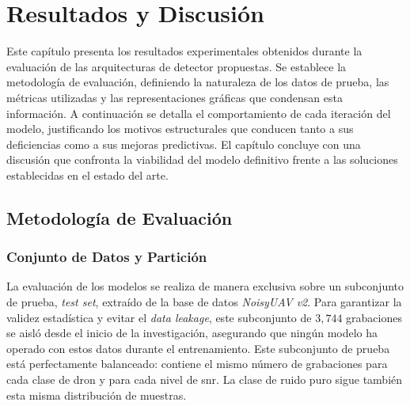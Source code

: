 \chapter{Resultados y Discusión}
\label{cap:resultados_discusion}

Este capítulo presenta los resultados experimentales obtenidos durante la evaluación de las arquitecturas de detector propuestas. Se establece la metodología de evaluación, definiendo la naturaleza de los datos de prueba, las métricas utilizadas y las representaciones gráficas que condensan esta información. A continuación se detalla el comportamiento de cada iteración del modelo, justificando los motivos estructurales que conducen tanto a sus deficiencias como a sus mejoras predictivas. El capítulo concluye con una discusión que confronta la viabilidad del modelo definitivo frente a las soluciones establecidas en el estado del arte.

\section{Metodología de Evaluación}
\label{sec:metodologia_evaluacion}

\subsection{Conjunto de Datos y Partición}
\label{subsec:eval_dataset}

La evaluación de los modelos se realiza de manera exclusiva sobre un subconjunto de prueba, \textit{test set}, extraído de la base de datos \textit{NoisyUAV v2}. Para garantizar la validez estadística y evitar el \textit{data leakage}, este subconjunto de $3,744$ grabaciones se aisló desde el inicio de la investigación, asegurando que ningún modelo ha operado con estos datos durante el entrenamiento. Este subconjunto de prueba está perfectamente balanceado: contiene el mismo número de grabaciones para cada clase de dron y para cada nivel de \gls{snr}. La clase de ruido puro sigue también esta misma distribución de muestras.

